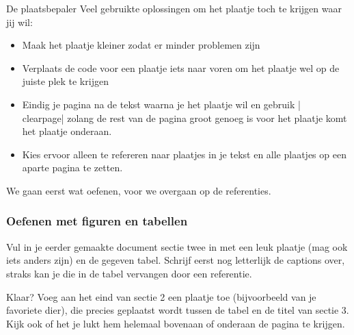 \documentclass{cursuspresentatie}
\begin{document}
\begin{frame}[allowframebreaks]{De plaatsbepaler}
	Veel gebruikte oplossingen om het plaatje toch te krijgen waar jij wil:
	\begin{itemize}
		\item Maak het plaatje kleiner zodat er minder problemen zijn
		\item Verplaats de code voor een plaatje iets naar voren om het plaatje
		wel op de juiste plek te krijgen
		\item Eindig je pagina na de tekst waarna je het plaatje wil en gebruik
		\hll|\\clearpage| zolang de rest van de pagina groot
		genoeg is voor het plaatje komt het plaatje onderaan.
		\item Kies ervoor alleen te refereren naar plaatjes in je tekst en alle
		plaatjes op een aparte pagina te zetten.
	\end{itemize}
We gaan eerst wat oefenen, voor we overgaan op de referenties.
\end{frame}

\begin{frame}
	\frametitle{Oefenen met figuren en tabellen}
	Vul in je eerder gemaakte document sectie twee in met een leuk plaatje (mag
	ook iets anders zijn) en de gegeven tabel. Schrijf eerst nog letterlijk de
	captions over, straks kan je die in de tabel vervangen door een referentie.

	Klaar?	Voeg aan het eind van sectie 2 een plaatje toe (bijvoorbeeld van je
	favoriete dier), die precies geplaatst wordt tussen de tabel en de titel van
	sectie 3. Kijk ook of het je lukt hem helemaal bovenaan of onderaan de
	pagina te krijgen.
\end{frame}
	
\end{document}
